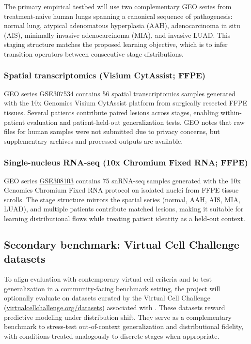 \documentclass[conference]{IEEEtran}
\begin{document}
The primary empirical testbed will use two complementary GEO series from treatment-naive human lungs spanning a canonical sequence of pathogenesis: normal lung, atypical adenomatous hyperplasia (AAH), adenocarcinoma in situ (AIS), minimally invasive adenocarcinoma (MIA), and invasive LUAD. This staging structure matches the proposed learning objective, which is to infer transition operators between consecutive stage distributions.

\subsubsection{Spatial transcriptomics (Visium CytAssist; FFPE)}
GEO series \href{https://www.ncbi.nlm.nih.gov/geo/query/acc.cgi?acc=GSE307534}{GSE307534} contains 56 spatial transcriptomics samples generated with the 10x Genomics Visium CytAssist platform from surgically resected FFPE tissues. Several patients contribute paired lesions across stages, enabling within-patient evaluation and patient-held-out generalization tests. GEO notes that raw files for human samples were not submitted due to privacy concerns, but supplementary archives and processed outputs are available.

\subsubsection{Single-nucleus RNA-seq (10x Chromium Fixed RNA; FFPE)}
GEO series \href{https://www.ncbi.nlm.nih.gov/geo/query/acc.cgi?acc=GSE308103}{GSE308103} contains 75 snRNA-seq samples generated with the 10x Genomics Chromium Fixed RNA protocol on isolated nuclei from FFPE tissue scrolls. The stage structure mirrors the spatial series (normal, AAH, AIS, MIA, LUAD), and multiple patients contribute matched lesions, making it suitable for learning distributional flows while treating patient identity as a held-out context.

\subsection{Secondary benchmark: Virtual Cell Challenge datasets}

To align evaluation with contemporary virtual cell criteria and to test generalization in a community-facing benchmark setting, the project will optionally evaluate on datasets curated by the Virtual Cell Challenge (\href{https://virtualcellchallenge.org/datasets}{virtualcellchallenge.org/datasets}) associated with \cite{Roohani2025-yb}. These datasets reward predictive modeling under distribution shift. They serve as a complementary benchmark to stress-test out-of-context generalization and distributional fidelity, with conditions treated analogously to discrete stages when appropriate.
\end{document}
